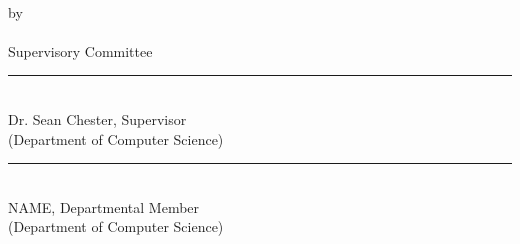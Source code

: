 
\pagestyle{plain} 
{}
{\sf
  {\centering
	\TITLE\\[4ex]
	by \\[2ex]
        {\AUTHOR}\\[20ex]
  }
   Supervisory Committee\\[4ex]

   \noindent\rule{\linewidth}{1mm}\\[1ex]
   Dr. Sean Chester, Supervisor\\
   (Department of Computer Science)\\[6ex]
\noindent\rule{\linewidth}{1mm}\\[1ex]
    NAME, Departmental Member\\
   (Department of Computer Science)\\[3ex]
}
\clearpage

